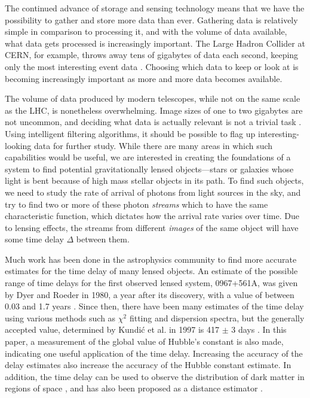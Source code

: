 \documentclass[a4paper,11pt]{article}
\begin{document}
  The continued advance of storage and sensing technology means that we have the
  possibility to gather and store more data than ever. Gathering data is
  relatively simple in comparison to processing it, and with the volume of data
  available, what data gets processed is increasingly important. The Large
  Hadron Collider at CERN, for example, throws away tens of gigabytes of data
  each second, keeping only the most interesting event data
  \cite{WLCGproc}. Choosing which data to keep or look at is becoming
  increasingly important as more and more data becomes available.

  The volume of data produced by modern telescopes, while not on the same scale
  as the LHC, is nonetheless overwhelming. Image sizes of one to two gigabytes
  are not uncommon, and deciding what data is actually relevant is not a trivial
  task \cite{starck2002handbook}. Using intelligent filtering algorithms, it
  should be possible to flag up interesting-looking data for further
  study. While there are many areas in which such capabilities would be useful,
  we are interested in creating the foundations of a system to find potential
  gravitationally lensed objects---stars or galaxies whose light is bent because
  of high mass stellar objects in its path. To find such objects, we need to
  study the rate of arrival of photons from light sources in the sky, and try to
  find two or more of these photon \emph{streams} which to have the same
  characteristic function, which dictates how the arrival rate varies over
  time. Due to lensing effects, the streams from different \emph{images} of the
  same object will have some time delay $\Delta$ between them.

  Much work has been done in the astrophysics community to find more accurate
  estimates for the time delay of many lensed objects. An estimate of the
  possible range of time delays for the first observed lensed system, 0967+561A,
  was given by Dyer and Roeder in 1980, a year after its discovery, with a value
  of between 0.03 and 1.7 years \cite{dyer1980range}. Since then, there have
  been many estimates of the time delay using various methods such as $\chi$$^2$
  fitting and dispersion spectra, but the generally accepted value, determined
  by Kundi\'c et al. in 1997 is 417 $\pm$ 3 days \cite{kundic1997robust}. In
  this paper, a measurement of the global value of Hubble's constant is also
  made, indicating one useful application of the time delay. Increasing the
  accuracy of the delay estimates also increase the accuracy of the Hubble
  constant estimate. In addition, the time delay can be used to observe the
  distribution of dark matter in regions of space
  \cite{schneider2006gravitational}, and has also been proposed as a distance
  estimator \cite{bozza2004time}.
\end{document}
